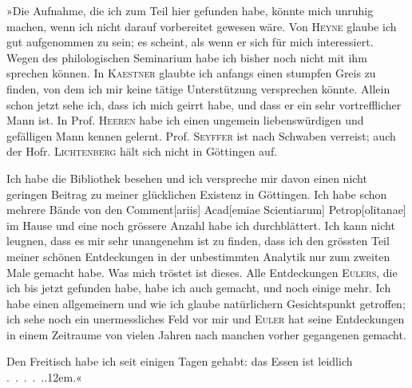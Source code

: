 »Die Aufnahme, die ich zum Teil hier gefunden habe, könnte mich unruhig
machen, wenn ich nicht darauf vorbereitet gewesen wäre. Von \textsc{Heyne}
glaube ich gut aufgenommen zu sein; es scheint, als wenn er sich für mich
interessiert. Wegen des philologischen Seminarium habe ich bisher noch
nicht mit ihm sprechen können. In \textsc{Kaestner} glaubte ich anfangs einen
stumpfen Greis zu finden, von dem ich mir keine tätige Unterstützung versprechen
könnte. Allein schon jetzt sehe ich, dass ich mich geirrt habe, und
dass er ein sehr vortrefflicher Mann ist. In Prof. \textsc{Heeren} habe ich einen
ungemein liebenswürdigen und gefälligen Mann kennen gelernt. Prof. \textsc{Seyffer}
ist nach Schwaben verreist; auch der Hofr. \textsc{Lichtenberg} hält sich nicht in
Göttingen auf.

Ich habe die Bibliothek besehen und ich verspreche mir davon einen
nicht geringen Beitrag zu meiner glücklichen Existenz in Göttingen. Ich
habe schon mehrere Bände von den Comment[ariis] Acad[emiae Scientiarum]
Petrop[olitanae] im Hause und eine noch grössere Anzahl habe ich durchblättert.
Ich kann nicht leugnen, dass es mir sehr unangenehm ist zu finden,
dass ich den grössten Teil meiner schönen Entdeckungen in der unbestimmten
Analytik nur zum zweiten Male gemacht habe. Was mich tröstet ist dieses.
Alle Entdeckungen \textsc{Eulers}, die ich bis jetzt gefunden habe, habe ich auch
gemacht, und noch einige mehr. Ich habe einen allgemeinern und wie ich
glaube natürlichern Gesichtspunkt getroffen; ich sehe noch ein unermessliches
Feld vor mir und \textsc{Euler} hat seine Entdeckungen in einem Zeitraume von
vielen Jahren nach manchen vorher gegangenen  gemacht.

Den Freitisch habe ich seit einigen Tagen gehabt: das Essen ist leidlich
.\ .\ .\ .\ .\kern.12em.«

